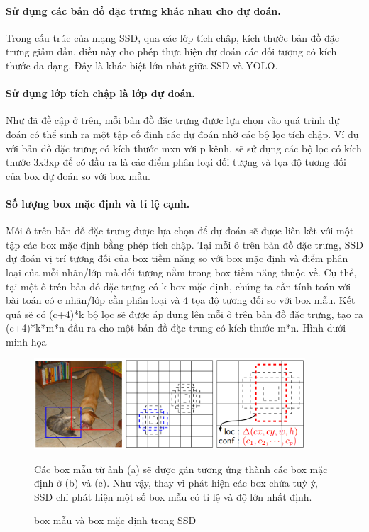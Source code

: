\documentclass[a4paper]{report}
\begin{document}
\paragraph*{Sử dụng các bản đồ đặc trưng khác nhau cho dự đoán.} Trong cấu trúc của mạng SSD, qua các lớp tích chập, kích thước bản đồ đặc trưng giảm dần, điều này cho phép thực hiện dự đoán các đối tượng có kích thước đa dạng. Đây là khác biệt lớn nhất giữa SSD và YOLO.\\

\paragraph*{Sử dụng lớp tích chập là lớp dự đoán.} Như đã đề cập ở trên, mỗi bản đồ đặc trưng được lựa chọn vào quá trình dự đoán có thể sinh ra một tập cố định các dự đoán nhờ các bộ lọc tích chập. Ví dụ với bản đồ đặc trưng có kích thước mxn với p kênh,  sẽ sử dụng các bộ lọc có kích thước 3x3xp để có đầu ra là các điểm phân loại đối tượng và tọa độ tương đối của box dự đoán so với box mẫu.\\

\paragraph*{Số lượng box mặc định và tỉ lệ cạnh.} Mỗi ô trên bản đồ đặc trưng được lựa chọn để dự đoán sẽ được liên kết với một tập các box mặc định bằng phép tích chập. Tại mỗi ô trên bản đồ đặc trưng, SSD dự đoán vị trí tương đối của box tiềm năng so với box mặc định và điểm phân loại của mỗi nhãn/lớp mà đối tượng nằm trong box tiềm năng thuộc về. 
Cụ thể, tại một ô trên bản đồ đặc trưng có k box mặc định, chúng ta cần tính toán với bài toán có c nhãn/lớp cần phân loại và 4 tọa độ tương đối so với box mẫu. Kết quả sẽ có (c+4)*k bộ lọc sẽ được áp dụng lên mỗi ô trên bản đồ đặc trưng, tạo ra (c+4)*k*m*n đầu ra cho một bản đồ đặc trưng có kích thước m*n. Hình dưới minh họa    \\

\begin{figure}[h!]
	\centering
	\includegraphics[width=0.9\textwidth]{3_ssd_box.png}
	\caption[Caption for LOF]{box mẫu và box mặc định trong SSD \cite{ssd}}
	Các box mẫu từ ảnh (a) sẽ được gán tương ứng thành các box mặc định ở (b) và (c). Như vậy, thay vì phát hiện các box chứa tuỳ ý, SSD chỉ phát hiện một số box mẫu có tỉ lệ và độ lớn nhất định.  
\end{figure}
\end{document}
